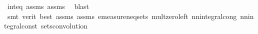 \begin{isabellebody}
\ int{\isacharunderscore}{\kern0pt}eq\ assms{\isacharparenleft}{\kern0pt}{}{\isacharparenright}{\kern0pt}\ assms{\isacharparenleft}{\kern0pt}{}{\isacharparenright}{\kern0pt}\ \isamarkupfalse%
\ blast\isanewline
\ \ \ \ \ \isamarkupfalse%
\ {\isacharparenleft}{\kern0pt}smt\ {\isacharparenleft}{\kern0pt}verit{\isacharcomma}{\kern0pt}\ best{\isacharparenright}{\kern0pt}\ assms{\isacharparenleft}{\kern0pt}{}{\isacharparenright}{\kern0pt}\ assms{\isacharparenleft}{\kern0pt}{}{\isacharparenright}{\kern0pt}\ emeasure{\isacharunderscore}{\kern0pt}neq{\isacharunderscore}{\kern0pt}{}{\isacharunderscore}{\kern0pt}sets\ mult{\isacharunderscore}{\kern0pt}zero{\isacharunderscore}{\kern0pt}left\ nn{\isacharunderscore}{\kern0pt}integral{\isacharunderscore}{\kern0pt}cong\ nn{\isacharunderscore}{\kern0pt}integral{\isacharunderscore}{\kern0pt}const\ sets{\isacharunderscore}{\kern0pt}convolution{\isacharparenright}{\kern0pt}\isanewline
\ \ \ \ \isamarkupfalse%
\isanewline
\ \ \isamarkupfalse%
\isanewline
{}\isamarkupfalse%
%
\endisatagproof
{\isafoldproof}%
%
\isadelimproof
%
\endisadelimproof
\isanewline
%
\isadelimtheory
\isanewline
%
\endisadelimtheory
%
\isatagtheory
{}\isamarkupfalse%
%
\endisatagtheory
{\isafoldtheory}%
%
\isadelimtheory
%
\endisadelimtheory
%
\end{isabellebody}%
\endinput
